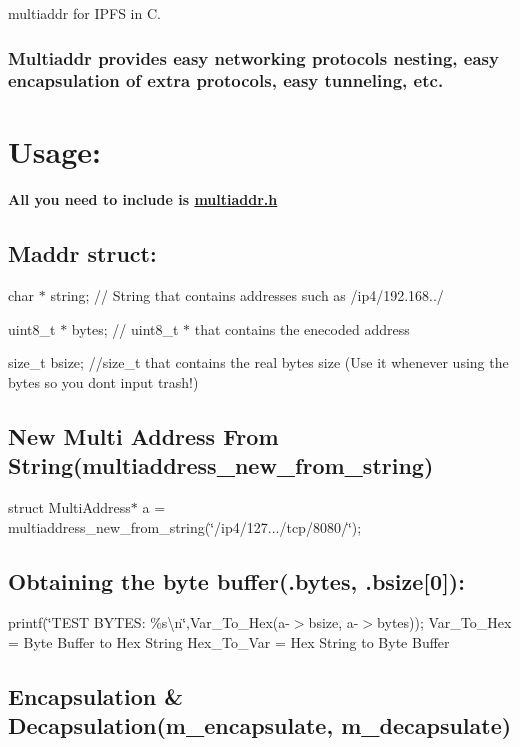 multiaddr for I\+P\+FS in C.

\subsubsection*{Multiaddr provides easy networking protocols nesting, easy encapsulation of extra protocols, easy tunneling, etc.}

\section*{Usage\+:}

\paragraph*{All you need to include is \mbox{\hyperlink{multiaddr_8h_source}{multiaddr.\+h}}}

\subsection*{Maddr struct\+:}


\begin{DoxyItemize}
\item char $\ast$ string; // String that contains addresses such as /ip4/192.168../
\item uint8\+\_\+t $\ast$ bytes; // uint8\+\_\+t $\ast$ that contains the enecoded address
\item size\+\_\+t bsize; //size\+\_\+t that contains the real bytes size (Use it whenever using the bytes so you don\textquotesingle{}t input trash!)
\end{DoxyItemize}

\subsection*{New Multi Address From String(multiaddress\+\_\+new\+\_\+from\+\_\+string)}

struct Multi\+Address$\ast$ a = multiaddress\+\_\+new\+\_\+from\+\_\+string(\char`\"{}/ip4/127.../tcp/8080/\char`\"{}); \subsection*{Obtaining the byte buffer(.bytes, .bsize\mbox{[}0\mbox{]})\+:}

printf(\char`\"{}\+T\+E\+S\+T B\+Y\+T\+E\+S\+: \%s\textbackslash{}n\char`\"{},Var\+\_\+\+To\+\_\+\+Hex(a-\/$>$bsize, a-\/$>$bytes)); Var\+\_\+\+To\+\_\+\+Hex = Byte Buffer to Hex String Hex\+\_\+\+To\+\_\+\+Var = Hex String to Byte Buffer \subsection*{Encapsulation \& Decapsulation(m\+\_\+encapsulate, m\+\_\+decapsulate)}

